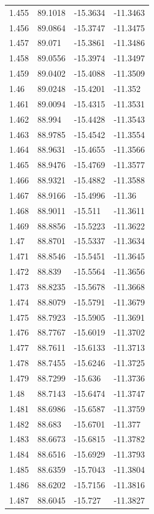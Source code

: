 \begin{tabular}{llll}
1.455 & 89.1018 & -15.3634 & -11.3463 \\
1.456 & 89.0864 & -15.3747 & -11.3475 \\
1.457 & 89.071 & -15.3861 & -11.3486 \\
1.458 & 89.0556 & -15.3974 & -11.3497 \\
1.459 & 89.0402 & -15.4088 & -11.3509 \\
1.46 & 89.0248 & -15.4201 & -11.352 \\
1.461 & 89.0094 & -15.4315 & -11.3531 \\
1.462 & 88.994 & -15.4428 & -11.3543 \\
1.463 & 88.9785 & -15.4542 & -11.3554 \\
1.464 & 88.9631 & -15.4655 & -11.3566 \\
1.465 & 88.9476 & -15.4769 & -11.3577 \\
1.466 & 88.9321 & -15.4882 & -11.3588 \\
1.467 & 88.9166 & -15.4996 & -11.36 \\
1.468 & 88.9011 & -15.511 & -11.3611 \\
1.469 & 88.8856 & -15.5223 & -11.3622 \\
1.47 & 88.8701 & -15.5337 & -11.3634 \\
1.471 & 88.8546 & -15.5451 & -11.3645 \\
1.472 & 88.839 & -15.5564 & -11.3656 \\
1.473 & 88.8235 & -15.5678 & -11.3668 \\
1.474 & 88.8079 & -15.5791 & -11.3679 \\
1.475 & 88.7923 & -15.5905 & -11.3691 \\
1.476 & 88.7767 & -15.6019 & -11.3702 \\
1.477 & 88.7611 & -15.6133 & -11.3713 \\
1.478 & 88.7455 & -15.6246 & -11.3725 \\
1.479 & 88.7299 & -15.636 & -11.3736 \\
1.48 & 88.7143 & -15.6474 & -11.3747 \\
1.481 & 88.6986 & -15.6587 & -11.3759 \\
1.482 & 88.683 & -15.6701 & -11.377 \\
1.483 & 88.6673 & -15.6815 & -11.3782 \\
1.484 & 88.6516 & -15.6929 & -11.3793 \\
1.485 & 88.6359 & -15.7043 & -11.3804 \\
1.486 & 88.6202 & -15.7156 & -11.3816 \\
1.487 & 88.6045 & -15.727 & -11.3827 \\

\end{tabular}
